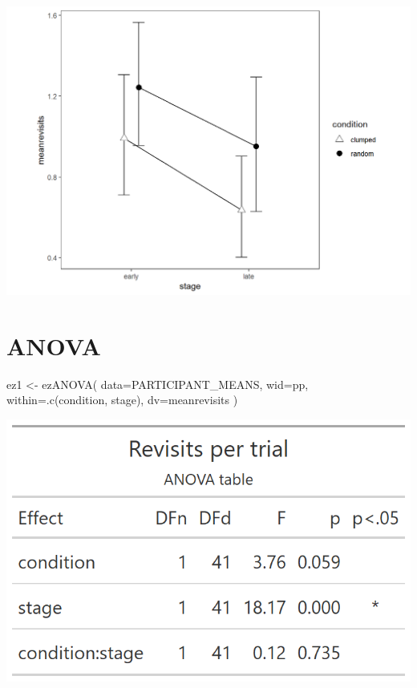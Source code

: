 \documentclass[
]{book}
\newenvironment{Shaded}{\begin{snugshade}}{\end{snugshade}}
\newcommand{\AttributeTok}[1]{\textcolor[rgb]{0.77,0.63,0.00}{#1}}
\newcommand{\FunctionTok}[1]{\textcolor[rgb]{0.00,0.00,0.00}{#1}}
\newcommand{\NormalTok}[1]{#1}
\newcommand{\OtherTok}[1]{\textcolor[rgb]{0.56,0.35,0.01}{#1}}
\begin{document}
\includegraphics[width=0.5\linewidth]{e1_figures/stage-revisits-1}

\hypertarget{anova}{%
\section{ANOVA}\label{anova}}

\begin{Shaded}
\begin{Highlighting}[]
\NormalTok{ez1 }\OtherTok{\textless{}{-}} \FunctionTok{ezANOVA}\NormalTok{(}
  \AttributeTok{data=}\NormalTok{PARTICIPANT\_MEANS,}
  \AttributeTok{wid=}\NormalTok{pp,}
  \AttributeTok{within=}\FunctionTok{.c}\NormalTok{(condition, stage),}
  \AttributeTok{dv=}\NormalTok{meanrevisits}
\NormalTok{)}
\end{Highlighting}
\end{Shaded}

\includegraphics[width=0.33\linewidth]{e1_figures/anova-table-revisits-1}

  
\end{document}

